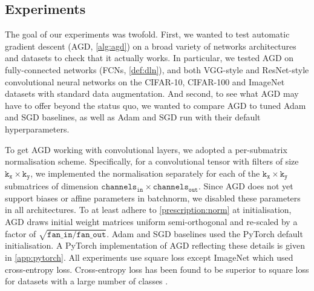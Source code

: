 \subsection{Experiments}



The goal of our experiments was twofold. First, we wanted to test automatic gradient descent (AGD, \cref{alg:agd}) on a broad variety of networks architectures and datasets to check that it actually works. In particular, we tested AGD on fully-connected networks (FCNs, \cref{def:dln}), and both VGG-style \citep{simonyan2015a} and ResNet-style \citep{He2015DeepRL} convolutional neural networks on the CIFAR-10, CIFAR-100 \citep{Krizhevsky09learningmultiple} and ImageNet \citep[ILSVRC2012]{deng2009imagenet} datasets with standard data augmentation. And second, to see what AGD may have to offer beyond the status quo, we wanted to compare AGD to tuned Adam and SGD baselines, as well as Adam and SGD run with their default hyperparameters.

To get AGD working with convolutional layers, we adopted a per-submatrix normalisation scheme. Specifically, for a convolutional tensor with filters of size $\mathtt{k_x} \times \mathtt{k_y}$, we implemented the normalisation separately for each of the $\mathtt{k_x} \times \mathtt{k_y}$ submatrices of dimension $\mathtt{channels_{in}} \times \mathtt{channels_{out}}$. Since AGD does not yet support biases or affine parameters in batchnorm, we disabled these parameters in all architectures. To at least adhere to \cref{prescription:norm} at initialisation, AGD draws initial weight matrices uniform semi-orthogonal and re-scaled by a factor of $\sqrt{\mathtt{fan\_in}/\mathtt{fan\_out}}$. Adam and SGD baselines used the PyTorch default initialisation. A PyTorch implementation of AGD reflecting these details is given in \cref{app:pytorch}. All experiments use square loss except ImageNet which used cross-entropy loss. Cross-entropy loss has been found to be superior to square loss for datasets with a large number of classes \citep{Demirkaya2020ExploringTR,HuiSquareCrossEntropy}.


